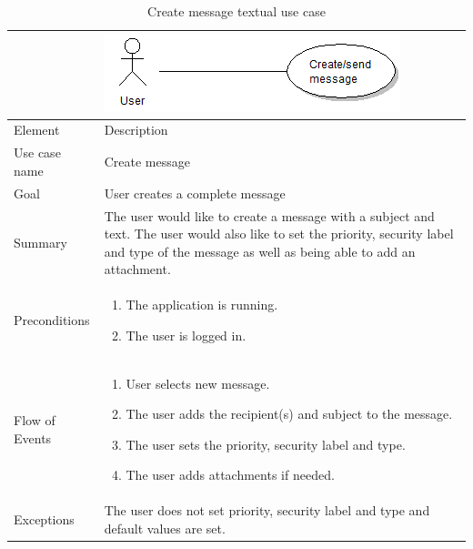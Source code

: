 \begin{table}
\begin{tabular}{p{3cm}p{12cm}}
& \includegraphics{create_message}\\ \hline
Element & Description \\ \hline
Use case name & Create message \\
Goal & User creates a complete message \\
Summary &The user would like to create a message with a subject and text. The user would also like to set the priority, security label and type of the message as well as being able to add an attachment. \\
Preconditions &
\begin{enumerate}
\item{}The application is running.
\item{}The user is logged in.
\end{enumerate} \\ \hline
Flow of Events &
\begin{enumerate}
\item{}User selects new message.
\item{}The user adds the recipient(s) and subject to the message.
\item{}The user sets the priority, security label and type.
\item{}The user adds attachments if needed.
\end{enumerate} \\ \hline
Exceptions & The user does not set priority, security label and type and default values are set.
\end{tabular}
\caption{Create message textual use case} \label{tab:createmessage}
\end{table}

